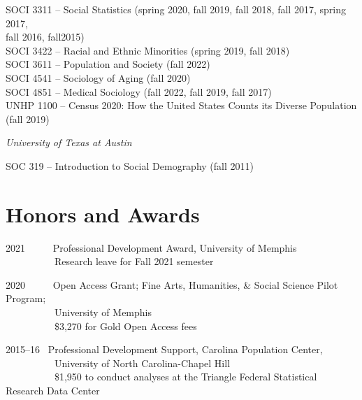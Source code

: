 \documentclass[11pt,]{article}
\begin{document}
SOCI 3311 -- Social Statistics (spring 2020, fall 2019, fall 2018, fall
2017, spring 2017,\\
\hspace*{0.333em}\hspace*{0.333em}\hspace*{0.333em}\hspace*{0.333em}fall
2016, fall2015)\\
SOCI 3422 -- Racial and Ethnic Minorities (spring 2019, fall 2018)\\
SOCI 3611 -- Population and Society (fall 2022)\\
SOCI 4541 -- Sociology of Aging (fall 2020)\\
SOCI 4851 -- Medical Sociology (fall 2022, fall 2019, fall 2017)\\
UNHP 1100 -- Census 2020: How the United States Counts its Diverse
Population (fall 2019)

\setlength{\leftskip}{0pt}

\emph{University of Texas at Austin}

\setlength{\leftskip}{1cm}

SOC 319 -- Introduction to Social Demography (fall 2011)

\setlength{\leftskip}{0pt}

\hypertarget{honors-and-awards}{%
\section{Honors and Awards}\label{honors-and-awards}}

2021 ~ ~ ~ Professional Development Award, University of Memphis\\
\hspace*{0.333em} ~ ~ ~ ~ ~ ~ Research leave for Fall 2021 semester

2020 ~ ~ ~ Open Access Grant; Fine Arts, Humanities, \& Social Science
Pilot Program;\\
\hspace*{0.333em} ~ ~ ~ ~ ~ ~ University of Memphis\\
\hspace*{0.333em} ~ ~ ~ ~ ~ ~ \$3,270 for Gold Open Access fees

2015--16 ~Professional Development Support, Carolina Population
Center,\\
\hspace*{0.333em} ~ ~ ~ ~ ~ ~ University of North Carolina-Chapel Hill\\
\hspace*{0.333em} ~ ~ ~ ~ ~ ~ \$1,950 to conduct analyses at the
Triangle Federal Statistical Research Data Center
\end{document}
